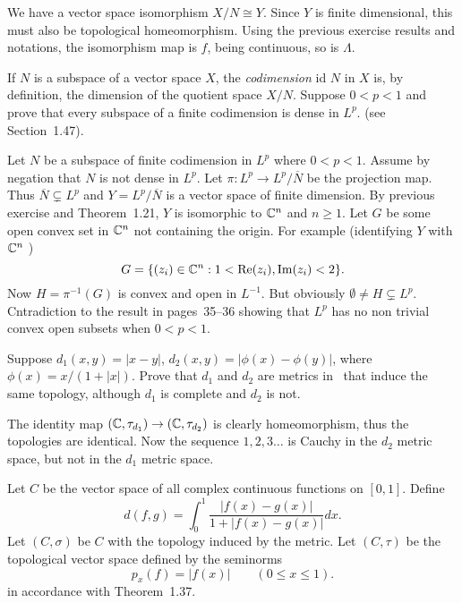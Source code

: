 \begin{enumerate}
\begin{itemize}
  We have a vector space isomorphism \(X/N \cong Y\).
  Since $Y$ is finite dimensional, this must also be topological homeomorphism.
  Using the previous exercise results and notations, 
  the isomorphism map is $f$, being continuous, so is \(\Lambda\).
  
\end{itemize}

\begin{excopy}
If $N$ is a subspace of a vector space $X$, the 
\emph{codimension} id $N$ in $X$ is, by definition, 
the dimension of the quotient space \(X/N\).
Suppose \(0<p<1\) and prove that every subspace of a finite codimension
is dense in \(L^p\). (see Section~1.47).
\end{excopy}

Let $N$ be a subspace of finite codimension in \(L^p\) where \(0<p<1\).
Assume by negation that $N$ is not dense in \(L^p\).
Let \(\pi: L^p \rightarrow L^p/\overline{N}\) be the projection map.
Thus \(\overline{N} \subsetneq L^p\) and \(Y = L^p/\overline{N}\)
is a vector space of finite dimension. By previous exercise
and Theorem~1.21, $Y$ is isomorphic to \(\mathbb{C}^n\) and \(n\geq 1\). 
Let $G$ be some open convex set in \(\mathbb{C}^n\) not containing the origin.
For example (identifying $Y$ with  \(\mathbb{C}^n\) )
\begin{equation*}
G = \{(z_i)\in \mathbb{C}^n: 1<\mathop{\rm Re}\nolimits(z_i),\mathop{\rm Im}\nolimits(z_i)<2\}.
\end{equation*}
Now \(H = \pi^{-1}(G)\) is convex and open in \(L^{-1}\). 
But obviously \(\emptyset \neq H \subsetneq L^p\).
Cntradiction to the result in pages~35--36 \cite{RudinFA79} showing that
\(L^p\)
has no non trivial convex open subsets
when \(0<p<1\).


\begin{excopy}
Suppose
 \(d_1(x,y) = |x-y|\), 
 \(d_2(x,y) = |\phi(x) - \phi(y)|\),
where \(\phi(x) = x/(1+|x|)\).
Prove that \(d_1\) and \(d_2\) are metrics in \R\ that induce
the same topology, although 
\(d_1\) is complete and \(d_2\) is not.
\end{excopy}

The identity map \((\mathbb{C},\tau_{d_1}) \rightarrow (\mathbb{C},\tau_{d_2})\) 
is clearly homeomorphism, thus the topologies are identical.
Now the sequence \(1,2,3\ldots\) is 
Cauchy in the \(d_2\) metric space, but not in the \(d_1\) metric space.

\begin{excopy} 
Let 
\label{ex:1:13}
$C$ be the vector space of all complex continuous functions on \([0,1]\).
Define
\begin{equation*}
 d(f,g) = \int_0^1 \frac{|f(x) - g(x)|}{1 + |f(x) - g(x)|} dx.
\end{equation*}
Let \((C,\sigma)\) be $C$ with the topology induced by the metric.
Let \((C,\tau)\) be the topological vector space defined by the seminorms
\begin{equation*}
 p_x(f) = |f(x)| \qquad (0\leq x \leq 1).
\end{equation*}
in accordance with Theorem~1.37.


\end{excopy}
\end{enumerate}

